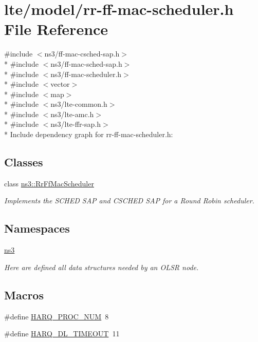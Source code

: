 \hypertarget{lte_2model_2rr-ff-mac-scheduler_8h}{}\section{lte/model/rr-\/ff-\/mac-\/scheduler.h File Reference}
\label{lte_2model_2rr-ff-mac-scheduler_8h}
{\ttfamily \#include $<$ns3/ff-\/mac-\/csched-\/sap.\+h$>$}\\*
{\ttfamily \#include $<$ns3/ff-\/mac-\/sched-\/sap.\+h$>$}\\*
{\ttfamily \#include $<$ns3/ff-\/mac-\/scheduler.\+h$>$}\\*
{\ttfamily \#include $<$vector$>$}\\*
{\ttfamily \#include $<$map$>$}\\*
{\ttfamily \#include $<$ns3/lte-\/common.\+h$>$}\\*
{\ttfamily \#include $<$ns3/lte-\/amc.\+h$>$}\\*
{\ttfamily \#include $<$ns3/lte-\/ffr-\/sap.\+h$>$}\\*
Include dependency graph for rr-\/ff-\/mac-\/scheduler.h\+:
\subsection*{Classes}
\begin{DoxyCompactItemize}
\item 
class \hyperlink{classns3_1_1RrFfMacScheduler}{ns3\+::\+Rr\+Ff\+Mac\+Scheduler}
\begin{DoxyCompactList}\small\item\em Implements the S\+C\+H\+ED S\+AP and C\+S\+C\+H\+ED S\+AP for a Round Robin scheduler. \end{DoxyCompactList}\end{DoxyCompactItemize}
\subsection*{Namespaces}
\begin{DoxyCompactItemize}
\item 
 \hyperlink{namespacens3}{ns3}
\begin{DoxyCompactList}\small\item\em Here are defined all data structures needed by an O\+L\+SR node. \end{DoxyCompactList}\end{DoxyCompactItemize}
\subsection*{Macros}
\begin{DoxyCompactItemize}
\item 
\#define \hyperlink{lte_2model_2rr-ff-mac-scheduler_8h_a9185d8d7d2b2979181d4a7044a3d3555}{H\+A\+R\+Q\+\_\+\+P\+R\+O\+C\+\_\+\+N\+UM}~8
\item 
\#define \hyperlink{lte_2model_2rr-ff-mac-scheduler_8h_add9e0c4889dc1b5b25686480b31ad166}{H\+A\+R\+Q\+\_\+\+D\+L\+\_\+\+T\+I\+M\+E\+O\+UT}~11
\end{DoxyCompactItemize}


